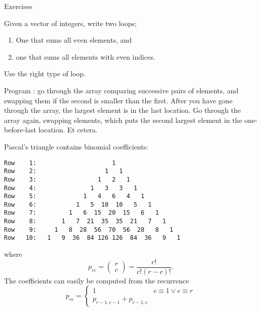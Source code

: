  {Exercises}

\begin{exercise}
  Given a vector of integers, write two loops;
  \begin{enumerate}
  \item One that sums all even elements, and
  \item one that sums all elements with even indices.
  \end{enumerate}
  Use the right type of loop.
\end{exercise}

\begin{exercise}
  Program : go through the array comparing
  successive pairs of elements, and swapping them if the second is
  smaller than the first. After you have gone through the array, the
  largest element is in the last location. Go through the array again,
  swapping elements, which puts the second largest element in the
  one-before-last location. Et cetera.
\end{exercise}

\begin{block}{Pascal's triangle}
  \label{sl:pascal-def}
  \small
   contains binomial coefficients:
{\scriptsize
\begin{verbatim}
Row    1:                     1
Row    2:                   1   1
Row    3:                 1   2   1
Row    4:               1   3   3   1
Row    5:             1   4   6   4   1
Row    6:           1   5  10  10   5   1
Row    7:         1   6  15  20  15   6   1
Row    8:       1   7  21  35  35  21   7   1
Row    9:     1   8  28  56  70  56  28   8   1
Row   10:   1   9  36  84 126 126  84  36   9   1
\end{verbatim}
}
where \[ p_{rc} = \begin{pmatrix} r\\c \end{pmatrix} = \frac{r!}{c!(r-c)! }. \]
The coefficients can easily be computed from the recurrence
\[ p_{rc} = 
\begin{cases}
  1&c\equiv 1\vee c\equiv r\\
  p_{r-1,c-1}+p_{r-1,c}
\end{cases}
\]
\end{block}

